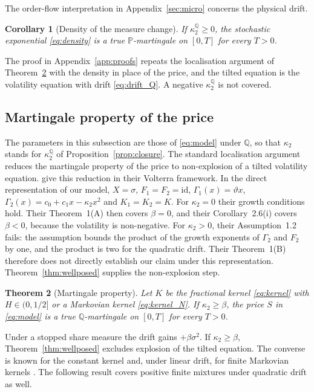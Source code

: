 \documentclass[11pt,a4paper]{article}
\newtheorem{theorem}{Theorem}[section]
\newtheorem{corollary}[theorem]{Corollary}
\theoremstyle{definition}
\newcommand{\Q}{\mathbb{Q}}
\renewcommand{\P}{\mathbb{P}}
\begin{document}
The order-flow interpretation in Appendix~\ref{sec:micro} concerns the physical drift.

\begin{corollary}[Density of the measure change]\label{cor:density}
If $\kappa_2^{\Q}\ge0$, the stochastic exponential \eqref{eq:density} is a true $\P$-martingale on $[0,T]$ for every $T>0$.
\end{corollary}

The proof in Appendix~\ref{app:proofs} repeats the localisation argument of Theorem~\ref{thm:martingale} with the density in place of the price, and the tilted equation is the volatility equation with drift \eqref{eq:drift_Q}. A negative $\kappa_2^{\Q}$ is not covered.

\subsection{Martingale property of the price}

The parameters in this subsection are those of \eqref{eq:model} under $\Q$, so that $\kappa_2$ stands for $\kappa_2^{\Q}$ of Proposition~\ref{prop:closure}. The standard localisation argument reduces the martingale property of the price to non-explosion of a tilted volatility equation. \citet[Lemma~3.1]{GuyonJeanninJourdain2026} give this reduction in their Volterra framework. In the direct representation of our model, $X=\sigma$, $F_1=F_2=\mathrm{id}$, $\Gamma_1(x)=\vartheta x$, $\Gamma_2(x)=c_0+c_1x-\kappa_2x^2$ and $K_1=K_2=K$.
For $\kappa_2=0$ their growth conditions hold. Their Theorem~1(A) then covers $\beta=0$, and their Corollary~2.6(i) covers $\beta<0$, because the volatility is non-negative.
For $\kappa_2>0$, their Assumption~1.2 fails: the assumption bounds the product of the growth exponents of $\Gamma_2$ and $F_2$ by one, and the product is two for the quadratic drift. Their Theorem~1(B) therefore does not directly establish our claim under this representation. Theorem~\ref{thm:wellposed} supplies the non-explosion step.

\begin{theorem}[Martingale property]\label{thm:martingale}
Let $K$ be the fractional kernel \eqref{eq:kernel} with $H\in(0,1/2]$ or a Markovian kernel \eqref{eq:kernel_N}. If $\kappa_2\ge\beta$, the price $S$ in \eqref{eq:model} is a true $\Q$-martingale on $[0,T]$ for every $T>0$.
\end{theorem}

Under a stopped share measure the drift gains $+\beta\sigma^2$. If $\kappa_2\ge\beta$, Theorem~\ref{thm:wellposed} excludes explosion of the tilted equation. The converse is known for the constant kernel \citep[Theorem~3.7]{SeppRakhmonov2023} and, under linear drift, for finite Markovian kernels \citep[Corollary~2.6(ii)]{GuyonJeanninJourdain2026}. The following result covers positive finite mixtures under quadratic drift as well.
\end{document}
